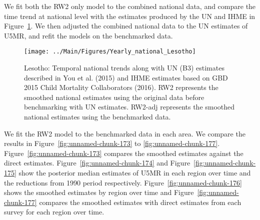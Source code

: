 \documentclass[12pt]{article}\usepackage[]{graphicx}\usepackage[]{color}
\newenvironment{knitrout}{}{} %
\begin{document}
We fit both the RW2 only model to the combined national data, and compare the time trend at national level with the estimates produced by the UN and IHME in Figure~\ref{fig:unnamed-chunk-172}. We then adjusted the combined national data to the UN estimates of U5MR, and refit the models on the benchmarked data. 

\begin{knitrout}
\color{fgcolor}\begin{figure}[bht]

{\centering \texttt{[image: ../Main/Figures/Yearly\_national\_Lesotho]} 

}

\caption[Lesotho]{Lesotho: Temporal national trends along with UN (B3) estimates described in You et al. (2015) and IHME estimates based on GBD 2015 Child Mortality Collaborators (2016). RW2 represents the smoothed national estimates using the original data before benchmarking with UN estimates. RW2-adj represents the smoothed national estimates using the benchmarked data.}\label{fig:unnamed-chunk-172}
\end{figure}


\end{knitrout}
 

We fit the RW2 model to the benchmarked data in each area. 
We compare the results in Figure~\ref{fig:unnamed-chunk-173} to \ref{fig:unnamed-chunk-177}.
Figure~\ref{fig:unnamed-chunk-173} compares the smoothed estimates against the direct estimates. Figure~\ref{fig:unnamed-chunk-174} and Figure~\ref{fig:unnamed-chunk-175} show the posterior median estimates of U5MR in each region over time and the reductions from 1990 period respectively.
Figure~\ref{fig:unnamed-chunk-176} shows the smoothed estimates by region over time and Figure~\ref{fig:unnamed-chunk-177} compares the smoothed estimates with direct estimates from each survey for each region over time.




\end{document}
